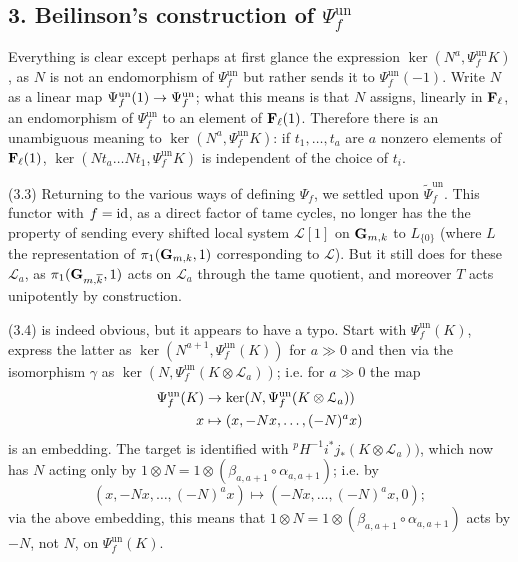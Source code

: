 \documentclass[deligne.tex]{subfiles}
\begin{document}
\subsection*{3. Beilinson's construction of $\Psi^{\mathrm{un}}_f$}
Everything is clear except perhaps at first glance the expression
$\ker(N^a,\Psi_f^{\mathrm{un}} K)$, as $N$ is not an endomorphism of
$\Psi_f^{\mathrm{un}}$ but rather sends it to $\Psi_f^{\mathrm{un}}(-1)$.
Write $N$ as a linear map
$\Psi_f^{\mathrm{un}}(1)\rightarrow\Psi_f^{\mathrm{un}}$; what this means is that
$N$ assigns, linearly in $\mathbf{F}_\ell$, an endomorphism of
$\Psi_f^{\mathrm{un}}$ to an element of $\mathbf{F}_\ell(1)$.
Therefore there is an unambiguous meaning to
$\ker(N^a,\Psi_f^{\mathrm{un}} K)$: if $t_1,\ldots,t_a$ are $a$ nonzero
elements of $\mathbf{F}_\ell(1)$, $\ker(Nt_a\ldots Nt_1,\Psi_f^{\mathrm{un}} K)$ is
independent of the choice of $t_i$.

(3.3) Returning to the various ways of defining $\Psi_f$, we settled upon
$\tilde\Psi_f^{\mathrm{un}}$. This functor with $f=\operatorname{id}$, as a direct factor
of tame cycles, no longer has the the property of sending every shifted 
local system $\mathcal L[1]$ on $\mathbf{G}_{m,k}$ to $L_{\{0\}}$
(where $L$ the representation of $\pi_1(\mathbf{G}_{m,k},1)$ corresponding to
$\mathcal L$). But it still does for these $\mathcal L_a$, as 
$\pi_1(\mathbf{G}_{m,\overline k},1)$ acts on $\mathcal L_a$ through the tame
quotient, and moreover $T$ acts unipotently by construction.

(3.4) is indeed obvious, but it appears to have a typo.
Start with $\Psi_f^{\mathrm{un}}(K)$, express the latter as
$\ker(N^{a+1},\Psi_f^{\mathrm{un}}(K))$ for $a\gg0$ and then via the 
isomorphism $\gamma$ as $\ker(N,\Psi_f^{\mathrm{un}}(K\otimes\mathcal L_a))$;
i.e. for $a\gg0$ the map
\begin{align*}
	\Psi_f^{\mathrm{un}}(K)&\rightarrow\ker(N,\Psi_f^{\mathrm{un}}(K\otimes\mathcal L_a)) \\
	x&\mapsto(x,-Nx,\ldots,(-N)^ax)
\end{align*}
is an embedding. The target is identified with
$^pH^{-1}i^*j_*(K\otimes\mathcal L_a))$, which now has $N$ acting only by
$1\otimes N=1\otimes(\beta_{a,a+1}\circ\alpha_{a,a+1})$; i.e. by
\begin{equation*}
	(x,-Nx,\ldots,(-N)^ax)\mapsto(-Nx,\ldots,(-N)^ax,0);
\end{equation*}
via the above embedding, this means that
$1\otimes N=1\otimes(\beta_{a,a+1}\circ\alpha_{a,a+1})$ acts by
$-N$, not $N$, on $\Psi_f^{\mathrm{un}}(K)$.
\end{document}
